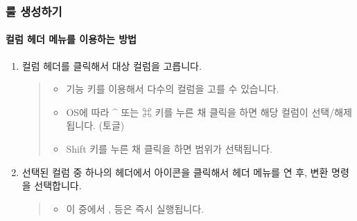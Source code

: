 \documentclass[letterpaper,10pt,english]{sphinxmanual}
\begin{document}
\subsubsection{룰 생성하기}
\label{\detokenize{discovery/part07/edit_rules:id2}}

\paragraph{컬럼 헤더 메뉴를 이용하는 방법}
\label{\detokenize{discovery/part07/edit_rules:id3}}\begin{enumerate}
\def\theenumi{\arabic{enumi}}
\def\labelenumi{\theenumi .}
\makeatletter\def\p@enumii{\p@enumi \theenumi .}\makeatother
\item {} 
컬럼 헤더를 클릭해서 대상 컬럼을 고릅니다.
\begin{quote}
\begin{itemize}
\item {} 
기능 키를 이용해서 다수의 컬럼을 고를 수 있습니다.

\item {} 
OS에 따라 \textasciicircum{} 또는 ⌘ 키를 누른 채 클릭을 하면 해당 컬럼이 선택/해제됩니다. (토글)

\item {} 
Shift 키를 누른 채 클릭을 하면 범위가 선택됩니다.

\end{itemize}

\begin{figure}[H]
\centering

\noindent{}
\end{figure}
\end{quote}

\item {} 
선택된 컬럼 중 하나의 헤더에서  아이콘을 클릭해서 헤더 메뉴를 연 후, 변환 명령을 선택합니다.
\begin{quote}
\begin{itemize}
\item {} 
이 중에서 ,  등은 즉시 실행됩니다.

\end{itemize}

\begin{figure}[H]
\centering

\noindent{}
\end{figure}
\end{quote}


\end{enumerate}
\end{document}
